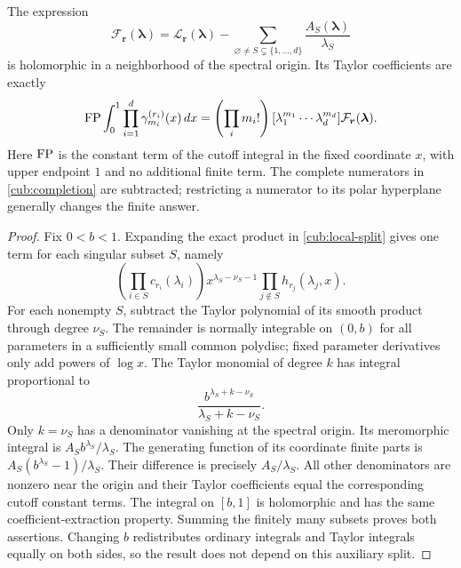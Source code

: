\begin{theorem}
\label{cub:general-completion}
The expression
\begin{equation}\label{cub:completion}
 \mathcal F_{\boldsymbol r}(\boldsymbol\lambda)
 =\mathcal L_{\boldsymbol r}(\boldsymbol\lambda)
   -\sum_{\varnothing\ne S\subsetneq\{1,\ldots,d\}}
            \frac{A_S(\boldsymbol\lambda)}{\lambda_S}
\end{equation}
is holomorphic in a neighborhood of the spectral origin.  Its Taylor
coefficients are exactly
\begin{equation}\label{cub:all-moments}
 \operatorname*{FP}\int_0^1\prod_{i=1}^d\gamma_{m_i}^{(r_i)}(x)\,dx
 =\left(\prod_i m_i!\right)
 [\lambda_1^{m_1}\cdots\lambda_d^{m_d}]
          \mathcal F_{\boldsymbol r}(\boldsymbol\lambda).
\end{equation}
Here $\operatorname*{FP}$ is the constant term of the cutoff integral in the fixed
coordinate $x$, with upper endpoint $1$ and no additional finite term.
The complete numerators in \eqref{cub:completion} are subtracted;
restricting a numerator to its polar hyperplane generally changes the
finite answer.
\end{theorem}

\begin{proof}
Fix $0<b<1$.  Expanding the exact product in
\eqref{cub:local-split} gives one term for each singular subset $S$,
namely
\[
 \left(\prod_{i\in S}c_{r_i}(\lambda_i)\right)
 x^{\lambda_S-\nu_S-1}
 \prod_{j\notin S}h_{r_j}(\lambda_j,x).
\]
For each nonempty $S$, subtract the Taylor polynomial of its smooth
product through degree $\nu_S$.  The remainder is normally integrable
on $(0,b)$ for all parameters in a sufficiently small common polydisc;
fixed parameter derivatives only add powers of $\log x$.
The Taylor monomial of degree $k$ has integral proportional to
\[
 \frac{b^{\lambda_S+k-\nu_S}}{\lambda_S+k-\nu_S}.
\]
Only $k=\nu_S$ has a denominator vanishing at the spectral origin.
Its meromorphic integral is $A_S b^{\lambda_S}/\lambda_S$.
The generating function of its coordinate finite parts is
$A_S(b^{\lambda_S}-1)/\lambda_S$.  Their difference is precisely
$A_S/\lambda_S$.  All other denominators are nonzero near the origin
and their Taylor coefficients equal the corresponding cutoff constant
terms.  The integral on $[b,1]$ is holomorphic and has the same
coefficient-extraction property.  Summing the finitely many subsets
proves both assertions.  Changing $b$ redistributes ordinary integrals
and Taylor integrals equally on both sides, so the result does not
depend on this auxiliary split.
\end{proof}


